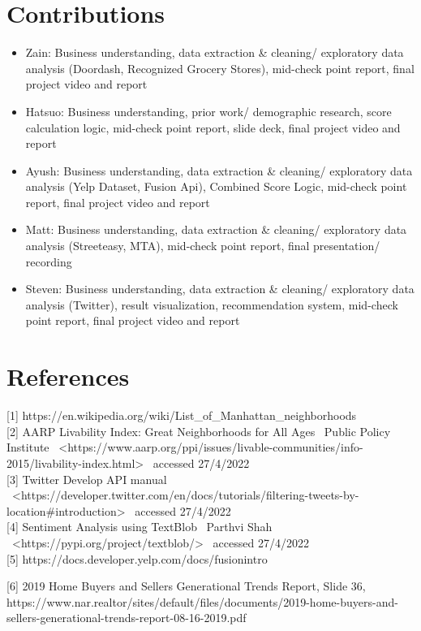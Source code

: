 \documentclass{article}
\begin{document}
\section{Contributions}
\begin{itemize}
\item Zain: Business understanding, data extraction \& cleaning/ exploratory data analysis (Doordash, Recognized Grocery Stores), mid-check point report, final project video and report
\item Hatsuo: Business understanding, prior work/ demographic research, score calculation logic, mid-check point report, slide deck, final project video and report
\item Ayush: Business understanding, data extraction \& cleaning/ exploratory data analysis (Yelp Dataset, Fusion Api), Combined Score Logic, mid-check point report, final project video and report
\item Matt: Business understanding, data extraction \& cleaning/ exploratory data analysis (Streeteasy, MTA), mid-check point report, final presentation/ recording
\item Steven: Business understanding, data extraction \& cleaning/ exploratory data analysis (Twitter), result visualization, recommendation system, mid-check point report, final project video and report
\end{itemize}

\section*{References}

[1] https://en.wikipedia.org/wiki/List\_of\_Manhattan\_neighborhoods \\

[2] AARP Livability Index: Great Neighborhoods for All Ages \ Public Policy Institute \ <https://www.aarp.org/ppi/issues/livable-communities/info-2015/livability-index.html> \ accessed 27/4/2022 \\

[3] Twitter Develop API manual \ <https://developer.twitter.com/en/docs/tutorials/filtering-tweets-by-location#introduction> \ accessed 27/4/2022 \\

[4] Sentiment Analysis using TextBlob \ Parthvi Shah \ <https://pypi.org/project/textblob/> \ accessed 27/4/2022 \\

[5] https://docs.developer.yelp.com/docs/fusion\-intro  

[6] 2019 Home Buyers and Sellers Generational Trends Report, Slide 36, https://www.nar.realtor/sites/default/files/documents/2019-home-buyers-and-sellers-generational-trends-report-08-16-2019.pdf \\
\end{document}

